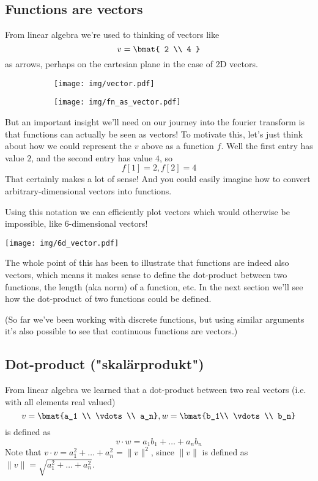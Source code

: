 \documentclass{article}
\newcommand{\0}{{\mathbf{0}}}
\begin{document}
\clearpage
\subsection{Functions are vectors}
From linear algebra we're used to thinking of vectors like
$$ v = \bmat{ 2 \\ 4 } $$
as arrows, perhaps on the cartesian plane in the case of 2D vectors.

\begin{figure}[h!]
  \centering
  \begin{subfigure}[b]{0.4\textwidth}
    \texttt{[image: img/vector.pdf]}
  \end{subfigure}%
  \begin{subfigure}[b]{0.4\textwidth}
    \texttt{[image: img/fn\_as\_vector.pdf]}
  \end{subfigure}
\end{figure}

But an important insight we'll need on our journey into the fourier transform
is that functions can actually be seen as vectors!
To motivate this, let's just think about how we could represent the $v$ above as a function $f$. Well the first entry
has value $2$, and the second entry has value $4$, so
$$ f[1] = 2, f[2] = 4 $$
That certainly makes a lot of sense!
And you could easily imagine how to convert arbitrary-dimensional vectors into functions.

Using this notation we can efficiently plot vectors which would otherwise be impossible, like 6-dimensional vectors!
\begin{center}
  \texttt{[image: img/6d\_vector.pdf]}
\end{center}

The whole point of this has been to illustrate that functions are indeed also vectors,
which means it makes sense to define the dot-product between two functions, the length (aka norm)
of a function, etc. In the next section we'll see how the dot-product of two functions could be defined.

(So far we've been working with discrete functions, but
using similar arguments it's also possible to see that continuous
functions are vectors.)


\subsection{Dot-product ("skalärprodukt")}
From linear algebra we learned that a dot-product between two real vectors (i.e. with all elements real valued)
$$v=\bmat{a_1 \\ \vdots \\ a_n}, w=\bmat{b_1\\ \vdots \\ b_n}$$
is defined as
$$ v\cdot w = a_1b_1 + \dots + a_n b_n  $$
Note that $v\cdot v = a_1^2 + \dots + a_n^2 = \| v \|^2$, since $\| v \|$ is defined as $\| v \| = \sqrt{a_1^2 + \dots + a_n^2}$.
\end{document}

